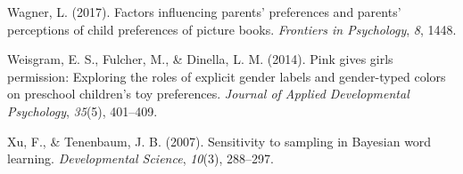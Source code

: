 \documentclass[
  english,
  ,man,floatsintext]{apa6}
\begin{document}
\leavevmode\hypertarget{ref-wagner2017factors}{}%
Wagner, L. (2017). Factors influencing parents' preferences and parents' perceptions of child preferences of picture books. \emph{Frontiers in Psychology}, \emph{8}, 1448.

\leavevmode\hypertarget{ref-weisgram2014pink}{}%
Weisgram, E. S., Fulcher, M., \& Dinella, L. M. (2014). Pink gives girls permission: Exploring the roles of explicit gender labels and gender-typed colors on preschool children's toy preferences. \emph{Journal of Applied Developmental Psychology}, \emph{35}(5), 401--409.

\leavevmode\hypertarget{ref-xu2007b}{}%
Xu, F., \& Tenenbaum, J. B. (2007). Sensitivity to sampling in Bayesian word learning. \emph{Developmental Science}, \emph{10}(3), 288--297.
\end{document}
